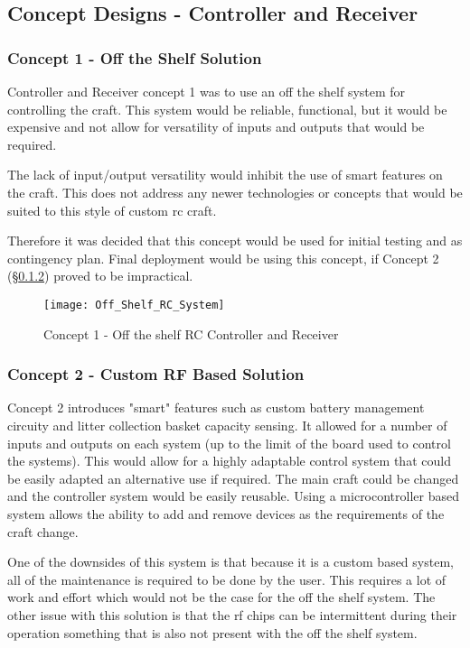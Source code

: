 \documentclass [12pt]{article}
\begin{document}
\subsection{Concept Designs - Controller and Receiver}
\subsubsection{Concept 1 - Off the Shelf Solution}
Controller and Receiver concept 1 was to use an off the shelf system for controlling the craft. This system would be reliable, functional, but it would be expensive and not allow for versatility of inputs and outputs that would be required. 

The lack of input/output versatility would inhibit the use of smart features on the craft. This does not address any newer technologies or concepts that would be suited to this style of custom \gls{rc} craft. 

Therefore it was decided that this concept would be used for initial testing and as contingency plan. Final deployment would be using this concept, if Concept 2 (§\ref{sec:concept_2}) proved to be impractical. 

\begin{figure}[H]
\centerline{\texttt{[image: Off\_Shelf\_RC\_System]}}
\caption{Concept 1 - Off the shelf RC Controller and Receiver}
\label{fig:Off_shelf_RC_System}
\end{figure} 


\subsubsection{Concept 2 - Custom RF Based Solution} \label{sec:concept_2}

Concept 2 introduces "smart" features such as custom battery management circuity and litter collection basket capacity sensing. It allowed for a number of inputs and outputs on each system (up to the limit of the board used to control the systems). This would allow for a highly adaptable control system that could be easily adapted an alternative use if required. The main craft could be changed and the controller system would be easily reusable. Using a microcontroller based system allows the ability to add and remove devices as the requirements of the craft change.

One of the downsides of this system is that because it is a custom based system, all of the maintenance is required to be done by the user. This requires a lot of work and effort which would not be the case for the off the shelf system. The other issue with this solution is that the \gls{rf} chips can be intermittent during their operation something that is also not present with the off the shelf system.  
\end{document}
